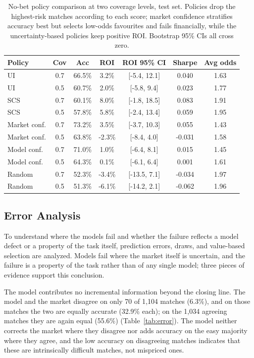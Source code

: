 \documentclass[10pt]{article}
\begin{document}
\begin{table}[htbp]
\centering
\caption{No-bet policy comparison at two coverage levels, test set. Policies drop
the highest-risk matches according to each score; market confidence stratifies
accuracy best but selects low-odds favourites and fails financially, while the
uncertainty-based policies keep positive ROI. Bootstrap 95\% CIs all cross
zero.}
\label{tab:nobet}
\begin{tabular}{lcccccc}
\toprule
Policy & Cov & Acc & ROI & ROI 95\% CI & Sharpe & Avg odds \\
\midrule
UI & 0.7 & 66.5\% & 3.2\% & [-5.4, 12.1] & 0.040 & 1.63 \\
UI & 0.5 & 60.7\% & 2.0\% & [-5.8, 9.4] & 0.023 & 1.77 \\
SCS & 0.7 & 60.1\% & 8.0\% & [-1.8, 18.5] & 0.083 & 1.91 \\
SCS & 0.5 & 57.8\% & 5.8\% & [-2.4, 13.4] & 0.059 & 1.95 \\
Market conf. & 0.7 & 73.2\% & 3.5\% & [-3.7, 10.3] & 0.055 & 1.43 \\
Market conf. & 0.5 & 63.8\% & -2.3\% & [-8.4, 4.0] & -0.031 & 1.58 \\
Model conf. & 0.7 & 71.0\% & 1.0\% & [-6.4, 8.1] & 0.015 & 1.45 \\
Model conf. & 0.5 & 64.3\% & 0.1\% & [-6.1, 6.4] & 0.001 & 1.61 \\
Random & 0.7 & 52.3\% & -3.4\% & [-13.5, 7.1] & -0.034 & 1.97 \\
Random & 0.5 & 51.3\% & -6.1\% & [-14.2, 2.1] & -0.062 & 1.96 \\
\bottomrule
\end{tabular}
\end{table}

\subsection{Error Analysis}
\label{sec:rq2}
To understand where the models fail and whether the failure reflects a model
defect or a property of the task itself, prediction errors, draws, and
value-based selection are analyzed. Models fail where the market itself is
uncertain, and the failure is a property of the task rather than of any single
model; three pieces of evidence support this conclusion.

The model contributes no incremental information beyond the closing
line. The model and the market disagree on only 70 of 1{,}104 matches (6.3\%),
and on those matches the two are equally accurate (32.9\% each); on the 1{,}034
agreeing matches they are again equal (55.6\%) (Table~\ref{tab:error}). The
model neither corrects the market where they disagree nor adds accuracy on the
easy majority where they agree, and the low accuracy on disagreeing matches
indicates that these are intrinsically difficult matches, not mispriced ones.
\end{document}
